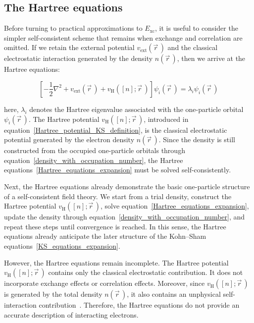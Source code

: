\subsection{The Hartree equations}

Before turning to practical approximations to $E_\mathrm{xc}$, it is useful to consider the simpler self-consistent scheme that remains when exchange and correlation are omitted. If we retain the external potential $v_\mathrm{ext}(\vec{r}\,)$ and the classical electrostatic interaction generated by the density $n(\vec{r}\,)$, then we arrive at the Hartree equations:

\begin{equation}
    \left[-\frac{1}{2}\nabla^2
        + v_\mathrm{ext}(\vec{r}\,)
        + v_\mathrm{H}([n];\vec{r}\,)\right]
    \psi_i(\vec{r}\,)
    = \lambda_i \psi_i(\vec{r}\,)
\label{Hartree_equations_expansion}
\end{equation}

here, $\lambda_i$ denotes the Hartree eigenvalue associated with the one-particle orbital $\psi_i(\vec{r}\,)$.
The Hartree potential $v_\mathrm{H}([n];\vec{r}\,)$, introduced in equation~\eqref{Hartree_potential_KS_definition}, is the classical electrostatic potential generated by the electron density $n(\vec{r}\,)$.
Since the density is still constructed from the occupied one-particle orbitals through equation~\eqref{density_with_occupation_number},
the Hartree equations~\eqref{Hartree_equations_expansion} must be solved self-consistently.

Next, the Hartree equations already demonstrate the basic one-particle structure of a self-consistent field theory.
We start from a trial density,
construct the Hartree potential $v_\mathrm{H}([n];\vec{r}\,)$,
solve equation~\eqref{Hartree_equations_expansion},
update the density through equation~\eqref{density_with_occupation_number},
and repeat these steps until convergence is reached.
In this sense, the Hartree equations already anticipate the later structure of the Kohn--Sham equations~\eqref{KS_equations_expansion}.

However, the Hartree equations remain incomplete.
The Hartree potential $v_\mathrm{H}([n];\vec{r}\,)$ contains only the classical electrostatic contribution.
It does not incorporate exchange effects or correlation effects.
Moreover, since $v_\mathrm{H}([n];\vec{r}\,)$ is generated by the total density $n(\vec{r}\,)$,
it also contains an unphysical self-interaction contribution~\cite{perdew1981self}.
Therefore, the Hartree equations do not provide an accurate description of interacting electrons.

